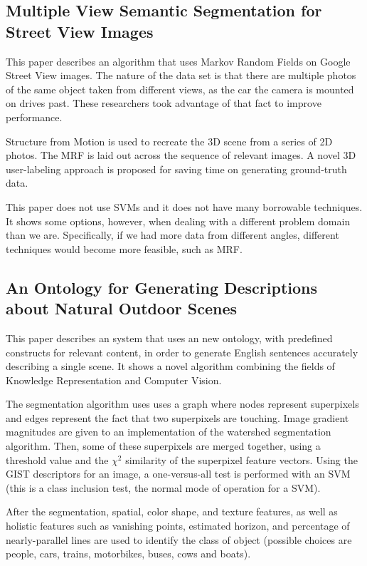 \documentclass[10pt,twocolumn,letterpaper]{article}
\begin{document}
\subsection{Multiple View Semantic Segmentation for Street View Images \cite{xiao}}

This paper describes an algorithm that uses Markov Random Fields on Google Street View images.  The nature of the data set is that there are multiple photos of the same object taken from different views, as the car the camera is mounted on drives past.  These researchers took advantage of that fact to improve performance.

Structure from Motion is used to recreate the 3D scene from a series of 2D photos.  The MRF is laid out across the sequence of relevant images.  A novel 3D user-labeling approach is proposed for saving time on generating ground-truth data.

This paper does not use SVMs and it does not have many borrowable techniques.  It shows some options, however, when dealing with a different problem domain than we are. Specifically, if we had more data from different angles, different techniques would become more feasible, such as MRF.

\subsection{An Ontology for Generating Descriptions about Natural Outdoor Scenes \cite{nwogu}}

This paper describes an system that uses an new ontology, with predefined constructs for relevant content, in order to generate English sentences accurately describing a single scene.  It shows a novel algorithm combining the fields of Knowledge Representation and Computer Vision.

The segmentation algorithm uses uses a graph where nodes represent superpixels and edges represent the fact that two superpixels are touching.  Image gradient magnitudes are given to an implementation of the watershed segmentation algorithm.  Then, some of these superpixels are merged together, using a threshold value and the $\chi^2$ similarity of the superpixel feature vectors.  Using the GIST descriptors for an image, a one-versus-all test is performed with an SVM (this is a class inclusion test, the normal mode of operation for a SVM).

After the segmentation, spatial, color shape, and texture features, as well as holistic features such as vanishing points, estimated horizon, and percentage of nearly-parallel lines are used to identify the class of object (possible choices are people, cars, trains, motorbikes, buses, cows and boats).
\end{document}
